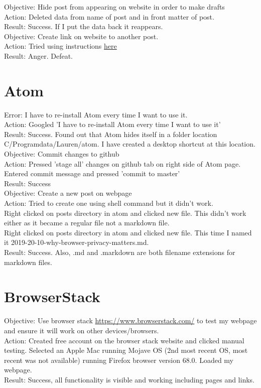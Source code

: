 \documentclass{article}
\begin{document}
Objective: Hide post from appearing on website in order to make drafts\\
Action: Deleted data from name of post and in front matter of post.\\
Result: Success. If I put the data back it reappears. \\

Objective: Create link on website to another post.\\
Action: Tried using instructions \href{https://jekyllrb.com/docs/liquid/tags/#linking-to-posts}{here}\\
Result: Anger. Defeat.

\section{Atom}
Error: I have to re-install Atom every time I want to use it.\\
Action: Googled 'I have to re-install Atom every time I want to use it'\\
Result: Success. Found out that Atom hides itself in a folder location C/Programdata/Lauren/atom. I have created a desktop shortcut at this location. \\

Objective: Commit changes to github\\
Action: Pressed 'stage all' changes on github tab on right side of Atom page.\\
Entered commit message and pressed 'commit to master'\\
Result: Success\\

Objective: Create a new post on webpage\\
Action: Tried to create one using shell command but it didn't work. \\
Right clicked on posts directory in atom and clicked new file. This didn't work either as it became a regular file not a markdown file.\\
Right clicked on posts directory in atom and clicked new file. This time I named it 2019-20-10-why-browser-privacy-matters.md.\\
Result: Success. Also, .md and .markdown are both filename extensions for markdown files.\\

\section{BrowserStack}

Objective: Use browser stack \href{https://www.browserstack.com/}{https://www.browserstack.com/} to test my webpage and ensure it will work on other devices/browsers. \\
Action: Created free account on the browser stack website and clicked manual testing. Selected an Apple Mac running Mojave OS (2nd most recent OS, most recent was not available) running Firefox browser version 68.0. Loaded my webpage.\\
Result: Success, all functionality is visible and working including pages and links.  
\end{document}
